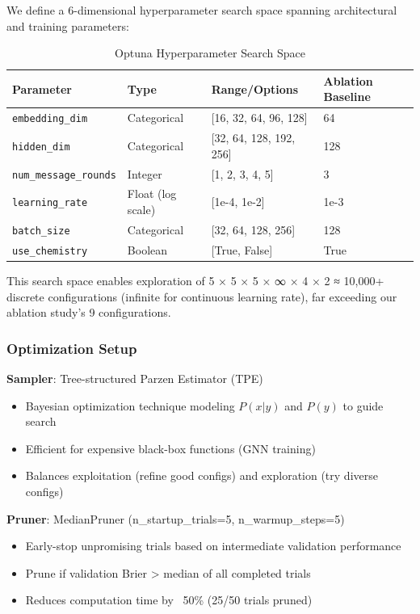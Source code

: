 We define a 6-dimensional hyperparameter search space spanning architectural and training parameters:

\begin{table}[htbp]
\centering
\caption{Optuna Hyperparameter Search Space}
\label{tab:optuna_search_space}
\small
\begin{tabular}{@{}llll@{}}
\toprule
\textbf{Parameter} & \textbf{Type} & \textbf{Range/Options} & \textbf{Ablation Baseline} \\
\midrule
\texttt{embedding\_dim} & Categorical & [16, 32, 64, 96, 128] & 64 \\
\texttt{hidden\_dim} & Categorical & [32, 64, 128, 192, 256] & 128 \\
\texttt{num\_message\_rounds} & Integer & [1, 2, 3, 4, 5] & 3 \\
\texttt{learning\_rate} & Float (log scale) & [1e-4, 1e-2] & 1e-3 \\
\texttt{batch\_size} & Categorical & [32, 64, 128, 256] & 128 \\
\texttt{use\_chemistry} & Boolean & [True, False] & True \\
\bottomrule
\end{tabular}
\end{table}

This search space enables exploration of 5 × 5 × 5 × ∞ × 4 × 2 ≈ 10,000+ discrete configurations (infinite for continuous learning rate), far exceeding our ablation study's 9 configurations.

\subsubsection{Optimization Setup}

\textbf{Sampler}: Tree-structured Parzen Estimator (TPE)~\citep{bergstra2011algorithms}
\begin{itemize}[noitemsep]
    \item Bayesian optimization technique modeling $P(x|y)$ and $P(y)$ to guide search
    \item Efficient for expensive black-box functions (GNN training)
    \item Balances exploitation (refine good configs) and exploration (try diverse configs)
\end{itemize}

\textbf{Pruner}: MedianPruner (n\_startup\_trials=5, n\_warmup\_steps=5)
\begin{itemize}[noitemsep]
    \item Early-stop unpromising trials based on intermediate validation performance
    \item Prune if validation Brier > median of all completed trials
    \item Reduces computation time by ~50\% (25/50 trials pruned)
\end{itemize}

